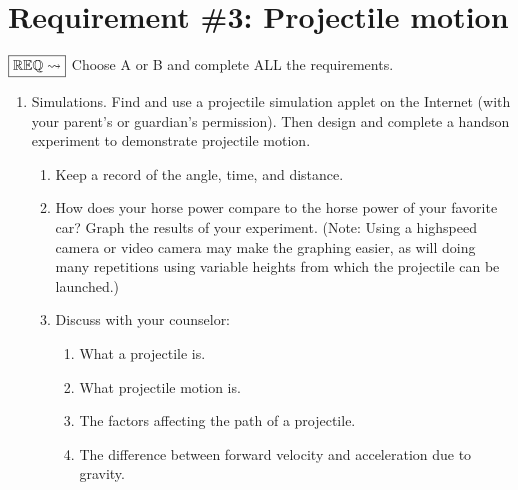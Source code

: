 \documentclass[letterpaper,10pt,english,openany,oneside]{sphinxmanual}
\begin{document}
\chapter{Requirement \#3: Projectile motion}
\label{\detokenize{requirement3:requirement-3-projectile-motion}}\label{\detokenize{requirement3::doc}}
\(\boxed{\mathbb{REQ}\Large \rightsquigarrow}\) Choose A or B and complete ALL the requirements.
\begin{enumerate}
%
\item {} 
Simulations. Find and use a projectile simulation applet on the Internet (with your parent’s or guardian’s permission). Then design and complete a hands\sphinxhyphen{}on experiment to demonstrate projectile motion.
\begin{enumerate}
%
\item {} 
Keep a record of the angle, time, and distance.

\item {} 
How does your horse power compare to the horse power of your favorite car? Graph the results of your experiment. (Note: Using a high\sphinxhyphen{}speed camera or
video camera may make the graphing easier, as will doing many repetitions using variable heights from which the projectile can be launched.)

\item {} 
Discuss with your counselor:
\begin{enumerate}
%
\item {} 
What a projectile is.

\item {} 
What projectile motion is.

\item {} 
The factors affecting the path of a projectile.

\item {} 
The difference between forward velocity and acceleration due to gravity.

\end{enumerate}

\end{enumerate}

\end{enumerate}
\end{document}
